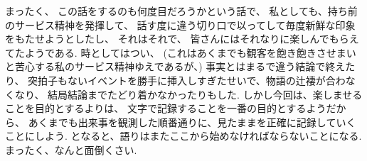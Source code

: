 まったく、
この話をするのも何度目だろうかという話で、
私としても、持ち前のサービス精神を発揮して、
話す度に違う切り口で以ってして毎度新鮮な印象をもたせようとしたし、
それはそれで、
皆さんにはそれなりに楽しんでもらえてたようである.
時としてはつい、
(これはあくまでも観客を飽き飽きさせまいと苦心する私のサービス精神ゆえであるが、)
事実とはまるで違う結論で終えたり、
突拍子もないイベントを勝手に挿入しすぎたせいで、物語の辻褄が合わなくなり、
結局結論までたどり着かなかったりもした.
しかし今回は、楽しませることを目的とするよりは、
文字で記録することを一番の目的とするようだから、
あくまでも出来事を観測した順番通りに、見たままを正確に記録していくことにしよう.
となると、語りはまたここから始めなければならないことになる.
まったく、なんと面倒くさい.

